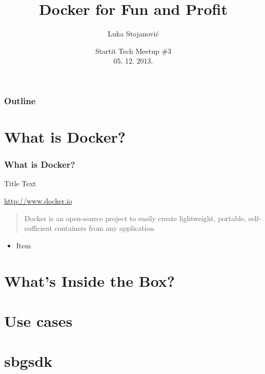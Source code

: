 \documentclass{beamer}
\title{Docker for Fun and Profit}
\author{Luka Stojanović}
\institute{
  luka@magrathea.rs \\
  Seven Bridges Genomics
}
\date{Startit Tech Meetup \#3\\ 05. 12. 2013.}
\begin{document}
  \begin{frame}
    \titlepage
  \end{frame}
  
  \begin{frame}
    \frametitle{Outline}
    \tableofcontents
  \end{frame}
  
  \section{What is Docker?}
  \begin{frame}
    \frametitle{What is Docker?}
    \begin{block}{Title}
            Text
    \end{block}
    \url{http://www.docker.io}
    \begin{quote}
    	Docker is an open-source project to easily create lightweight, 
    	portable, self-sufficient containers from any application
    \end{quote}
    
    
    \begin{itemize}
            \item Item
    \end{itemize}
    
  \end{frame}
  
  \section{What's Inside the Box?}
  \begin{frame}
    
  \end{frame}
  
  \section{Use cases}
  \begin{frame}
    
  \end{frame}
  
  \section{sbgsdk}
  \begin{frame}
    
  \end{frame}
  
\end{document}
